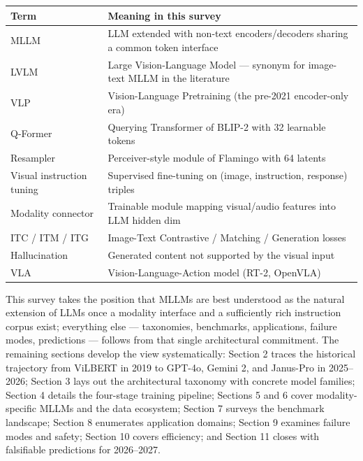 {\def\LTcaptype{none} %
\begin{longtable}[]{@{}
  >{\raggedright\arraybackslash}p{}
  >{\raggedright\arraybackslash}p{}@{}}
\toprule\noalign{}
\begin{minipage}[b]{\linewidth}\raggedright
\textbf{Term}
\end{minipage} & \begin{minipage}[b]{\linewidth}\raggedright
\textbf{Meaning in this survey}
\end{minipage} \\
\midrule\noalign{}
\endhead
\bottomrule\noalign{}
\endlastfoot
MLLM & LLM extended with non-text encoders/decoders sharing a common token interface \\
LVLM & Large Vision-Language Model --- synonym for image-text MLLM in the literature \\
VLP & Vision-Language Pretraining (the pre-2021 encoder-only era) \\
Q-Former & Querying Transformer of BLIP-2 with 32 learnable tokens \\
Resampler & Perceiver-style module of Flamingo with 64 latents \\
Visual instruction tuning & Supervised fine-tuning on (image, instruction, response) triples \\
Modality connector & Trainable module mapping visual/audio features into LLM hidden dim \\
ITC / ITM / ITG & Image-Text Contrastive / Matching / Generation losses \\
Hallucination & Generated content not supported by the visual input \\
VLA & Vision-Language-Action model (RT-2, OpenVLA) \\
\end{longtable}
}

This survey takes the position that MLLMs are best understood as the natural extension of LLMs once a modality interface and a sufficiently rich instruction corpus exist; everything else --- taxonomies, benchmarks, applications, failure modes, predictions --- follows from that single architectural commitment. The remaining sections develop the view systematically: Section 2 traces the historical trajectory from ViLBERT in 2019 to GPT-4o, Gemini 2, and Janus-Pro in 2025--2026; Section 3 lays out the architectural taxonomy with concrete model families; Section 4 details the four-stage training pipeline; Sections 5 and 6 cover modality-specific MLLMs and the data ecosystem; Section 7 surveys the benchmark landscape; Section 8 enumerates application domains; Section 9 examines failure modes and safety; Section 10 covers efficiency; and Section 11 closes with falsifiable predictions for 2026--2027.

